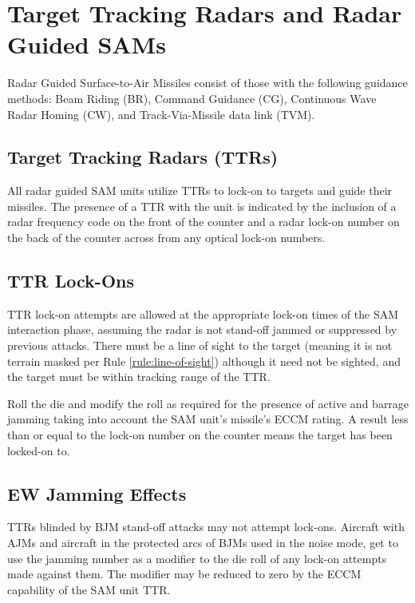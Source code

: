 \section{Target Tracking Radars and Radar Guided SAMs}
\label{rule:radar-guided-sams}

Radar Guided Surface-to-Air Missiles consist of those with the following guidance methods: Beam Riding (BR), Command Guidance (CG), Continuous Wave Radar Homing (CW), and Track-Via-Missile data link (TVM).

\subsection{Target Tracking Radars (TTRs)} All radar guided SAM units utilize TTRs to lock-on to targets and guide their missiles. The presence of a TTR with the unit is indicated by the inclusion of a radar frequency code on the front of the counter and a radar lock-on number on the back of the counter across from any optical lock-on numbers.

\subsection{TTR Lock-Ons}

TTR lock-on attempts are allowed at the appropriate lock-on times of the SAM interaction phase, assuming the radar is not stand-off jammed or suppressed by previous attacks. There must be a line of sight to the target (meaning it is not terrain masked per Rule \ref{rule:line-of-sight}) although it need not be sighted, and the target must be within tracking range of the TTR.

Roll the die and modify the roll as required for the presence of active and barrage jamming taking into account the SAM unit's missile's ECCM rating. A result less than or equal to the lock-on number on the counter means the target has been locked-on to.

\subsection{EW Jamming Effects} TTRs blinded by BJM stand-off attacks may not attempt lock-ons. Aircraft with AJMs and aircraft in the protected arcs of BJMs used in the noise mode, get to use the jamming number as a modifier to the die roll of any lock-on attempts made against them. The modifier may be reduced to zero by the ECCM capability of the SAM unit TTR.

